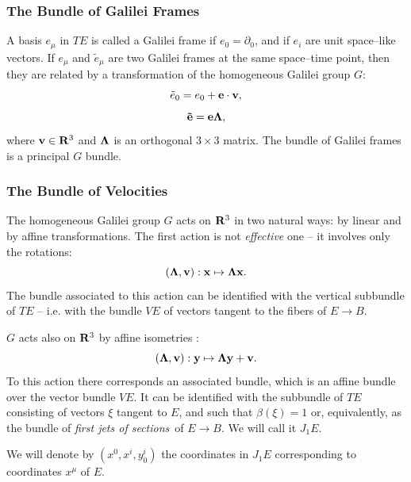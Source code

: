 \documentclass[12pt]{article}
\def\be{\begin{equation}} \def\ee{\end{equation}}
\begin{document}
\subsubsection{The Bundle of Galilei Frames}
A basis $e_{\mu}$ in $TE$ is called a Galilei frame if
$e_0=\partial_0$,  and if $e_i$ are unit space--like vectors.  If
$e_\mu$ and $\tilde{e}_\mu$ are two Galilei frames at the same
space--time point,  then they are related by a transformation of the homogeneous
Galilei group $G$: 
\be
\tilde{e}_0=e_0+{\bf e\cdot v} , 
\ee
\be
{\bf \tilde{e}}={\bf e}{\bf\Lambda} , 
\ee
where ${\bf v}\in {\bf R}^3$ and ${\bf \Lambda}$ is an orthogonal
$3\times 3$ matrix. 
The bundle of Galilei frames is a principal $G$ bundle. 
\subsubsection{The Bundle of Velocities }
The homogeneous Galilei group $G$ acts on ${\bf R}^3$ in two
natural ways:  by linear and by affine transformations.  The first
action is not {\em effective} one -- it involves only the rotations:
\be
 ({\bf \Lambda}, {\bf v}): {\bf x}\mapsto {\bf\Lambda x}. 
\ee
The bundle associated to this action can be identified with the
vertical subbundle of $TE$ -- i.e.  with the bundle $VE$ of vectors
tangent to the fibers of $E\rightarrow B$.

$G$ acts also on ${\bf R}^3$ by affine
isometries : 
\be
 ({\bf \Lambda}, {\bf v}): {\bf y}\mapsto {\bf\Lambda y}+{\bf v}  . 
\ee
To this action there corresponds an associated bundle,  which is an
affine bundle over the vector bundle $VE$. 
 It can be identified with the subbundle of $TE$ consisting of
vectors $\xi$ tangent to $E$, and such that $\beta  (\xi )=1$ or,
equivalently,  as the bundle of {\em first jets of sections}\, of
$E\rightarrow B$.  We will call it  $J_1E$.

We will denote by $ (x^0, x^{i}, y_0^{i})$ the coordinates in $J_1E$
corresponding to coordinates $x^{\mu}$  of $E$.  
\end{document}
